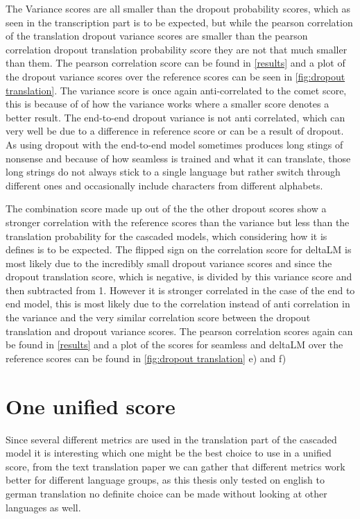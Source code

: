 The Variance scores are all smaller than the dropout probability scores, which as seen in the transcription part is to be expected, but while the pearson correlation of the translation dropout variance scores are smaller than the pearson correlation dropout translation probability score they are not that much smaller than them. The pearson correlation score can be found in \autoref{results} and a plot of the dropout variance scores over the reference scores can be seen in \autoref{fig:dropout translation}.
The variance score is once again anti-correlated to the comet score, this is because of of how the variance works where a smaller score denotes a better result. 
The end-to-end dropout variance is not anti correlated, which can very well be due to a difference in reference score or can be a result of dropout.
As using dropout with the end-to-end model sometimes produces long stings of nonsense and because of how seamless is trained and what it can translate, those long strings do not always stick to a single language but rather switch through different ones and occasionally include characters from different alphabets. 

The combination score made up out of the the other dropout scores show a stronger correlation with the reference scores than the variance but less than the translation probability for the cascaded models, which considering how it is defines is to be expected. 
The flipped sign on the correlation score for deltaLM is most likely due to the incredibly small dropout variance scores and since the dropout translation score, which is negative, is divided by this variance score and then subtracted from 1.
However it is stronger correlated in the case of the end to end model, this is most likely due to the correlation instead of anti correlation in the variance and the very similar correlation score between the dropout translation and dropout variance scores. 
The pearson correlation scores again can be found in \autoref{results} and a plot of the scores for seamless and deltaLM over the reference scores can be found in \autoref{fig:dropout translation} e) and f) 


\section{One unified score}
Since several different metrics are used in the translation part of the cascaded model it is interesting which one might be the best choice to use in a unified score, from the text translation paper \cite{fomicheva2020unsupervised} we can gather that different metrics work better for different language groups, as this thesis only tested on english to german translation no definite choice can be made without looking at other languages as well.


